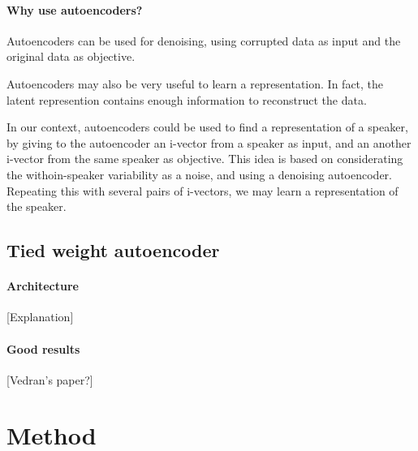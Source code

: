 \documentclass[conference]{IEEEtran}
\begin{document}
\paragraph{Why use autoencoders?}

Autoencoders can be used for denoising, using corrupted data as input and the original data as objective.

Autoencoders may also be very useful to learn a representation. In fact, the latent represention contains enough information to reconstruct the data.

In our context, autoencoders could be used to find a representation of a speaker, by giving to the autoencoder an i-vector from a speaker as input, and an another i-vector from the same speaker as objective. This idea is based on considerating the withoin-speaker variability as a noise, and using a denoising autoencoder. Repeating this with several pairs of i-vectors, we may learn a representation of the speaker. 



\subsection{Tied weight autoencoder}

\paragraph{Architecture}
[Explanation]

\paragraph{Good results}
[Vedran's paper?]

\section{Method}
\end{document}
